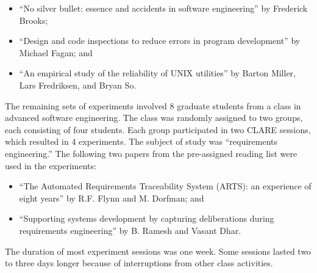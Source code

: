 \begin{itemize}
\item ``No silver bullet: essence and accidents in software engineering''
  by Frederick Brooks;

\item ``Design and code inspections to reduce errors in program
  development'' by Michael Fagan; and
  
\item ``An empirical study of the reliability of UNIX utilities'' by
  Barton Miller, Lars Fredriksen, and Bryan So.
\end{itemize}

The remaining sets of experiments involved 8 graduate students from a class
in advanced software engineering. The class was randomly assigned to two
groups, each consisting of four students. Each group participated in two
CLARE sessions, which resulted in 4 experiments. The subject of study was
``requirements engineering.'' The following two papers from the
pre-assigned reading list were used in the experiments:

\begin{itemize}
\item ``The Automated Requirements Traceability System (ARTS): an
  experience of eight years'' by R.F. Flynn and M. Dorfman; and
  
\item ``Supporting systems development by capturing deliberations during
  requirements engineering'' by B. Ramesh and Vasant Dhar.
\end{itemize}

The duration of most experiment sessions was one week.  Some sessions
lasted two to three days longer because of interruptions from other class
activities.

